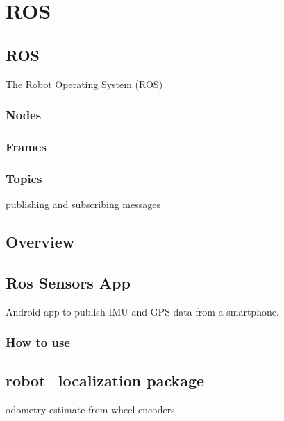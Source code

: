 \chapter{ROS}

\section{ROS}
The Robot Operating System (ROS)


\subsection{Nodes}

\subsection{Frames}

\subsection{Topics}
publishing and subscribing messages


\section{Overview}

\section{Ros Sensors App}
Android app to publish IMU and GPS data from a smartphone.
\subsection{How to use}


\section{robot\_localization package}
odometry estimate from wheel encoders

\cite{robot_localization_paper}